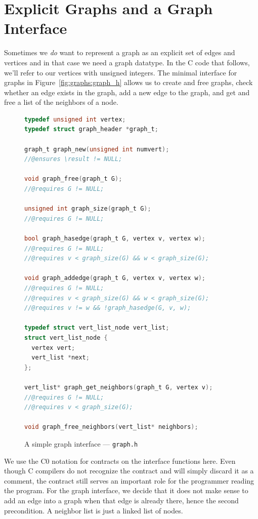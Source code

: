 \section{Explicit Graphs and a Graph Interface}
\label{sec:graphs:graph_interface}

Sometimes we \emph{do} want to represent a graph as an explicit set of
edges and vertices and in that case we need a graph datatype. In the C
code that follows, we'll refer to our vertices with unsigned integers.
The minimal interface for graphs in Figure~\ref{fig:graphs:graph_h} allows us
to create and free graphs, check whether an edge exists in the graph,
add a new edge to the graph, and get and free a list of the neighbors
of a node.

\begin{gram}[graph.h]
\label{fig:graphs:graph_h}
\begin{figure}[h!]
\begin{lstlisting}[language=c, aboveskip=0pt, belowskip=0pt]
typedef unsigned int vertex;
typedef struct graph_header *graph_t;

graph_t graph_new(unsigned int numvert);
//@ensures \result != NULL;

void graph_free(graph_t G);
//@requires G != NULL;

unsigned int graph_size(graph_t G);
//@requires G != NULL;

bool graph_hasedge(graph_t G, vertex v, vertex w);
//@requires G != NULL;
//@requires v < graph_size(G) && w < graph_size(G);

void graph_addedge(graph_t G, vertex v, vertex w);
//@requires G != NULL;
//@requires v < graph_size(G) && w < graph_size(G);
//@requires v != w && !graph_hasedge(G, v, w);

typedef struct vert_list_node vert_list;
struct vert_list_node {
  vertex vert;
  vert_list *next;
};

vert_list* graph_get_neighbors(graph_t G, vertex v);
//@requires G != NULL;
//@requires v < graph_size(G);

void graph_free_neighbors(vert_list* neighbors);
\end{lstlisting}
\caption{A simple graph interface --- \lstinline'graph.h'}
\end{figure}
\end{gram}

We use the C0 notation for contracts on the interface functions here.
Even though C compilers do not recognize the \requires{}
contract and will simply discard it as a comment, the contract still
serves an important role for the programmer reading the program.  For
the graph interface, we decide that it does not make sense to add an
edge into a graph when that edge is already there, hence the second
precondition.  A neighbor list is just a linked list of nodes.

